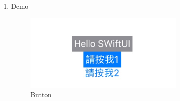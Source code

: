 \documentclass[a4paper,12pt]{article}
\begin{document}
\begin{enumerate}
\item Demo
\label{sec:orga9ee5fc}
\begin{figure}[htbp]
\centering
\includegraphics[width=300]{images/swbtn-1.jpg}
\caption{\label{fig:Button-1}Button}
\end{figure}
\end{enumerate}
\end{document}
